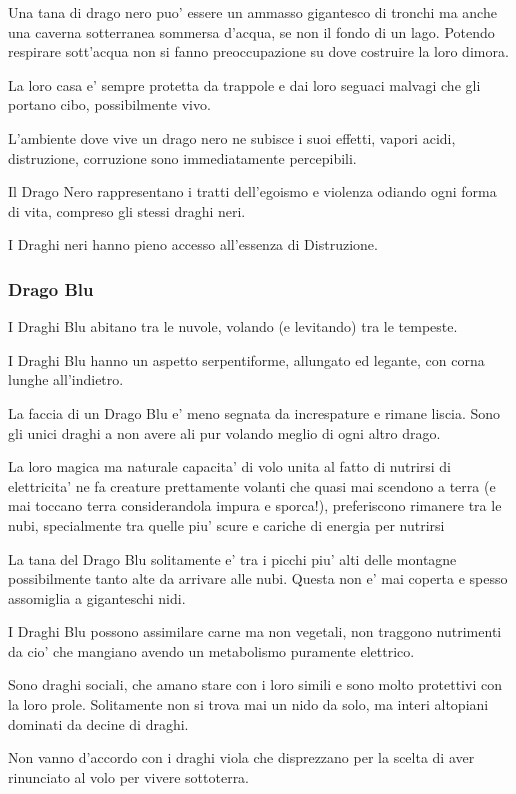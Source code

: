 \documentclass[a4paper,11pt,twoside,openany]{book}
\begin{document}
{Una tana di drago nero puo' essere un ammasso gigantesco di tronchi ma anche una caverna sotterranea sommersa d'acqua, se non il fondo di un lago.
Potendo respirare sott'acqua non si fanno preoccupazione su dove costruire la loro dimora.

La loro casa e' sempre protetta da trappole e dai loro seguaci malvagi che gli portano cibo, possibilmente vivo.

L'ambiente dove vive un drago nero ne subisce i suoi effetti, vapori acidi, distruzione, corruzione sono immediatamente percepibili.

Il Drago Nero rappresentano i tratti dell'egoismo e violenza odiando ogni forma di vita, compreso gli stessi draghi neri.

I Draghi neri hanno pieno accesso all'essenza di Distruzione.


\subsubsection{Drago Blu} 

I Draghi Blu abitano tra le nuvole, volando (e levitando) tra le tempeste.

I Draghi Blu hanno un aspetto serpentiforme, allungato ed legante, con corna lunghe all'indietro.

La faccia di un Drago Blu e' meno segnata da increspature e rimane liscia.
Sono gli unici draghi a non avere ali pur volando meglio di ogni altro drago.

La loro magica ma naturale capacita' di volo unita al fatto di nutrirsi di elettricita' ne fa creature prettamente volanti che quasi mai scendono a terra (e mai toccano terra considerandola impura e sporca!), preferiscono rimanere tra le nubi, specialmente tra quelle piu' scure e cariche di energia per nutrirsi 

La tana del Drago Blu solitamente e' tra i picchi piu' alti delle montagne possibilmente tanto alte da arrivare alle nubi. Questa non e' mai coperta e spesso assomiglia a giganteschi nidi.

I Draghi Blu possono assimilare carne ma non vegetali, non traggono nutrimenti da cio' che mangiano avendo un metabolismo puramente elettrico.

Sono draghi sociali, che amano stare con i loro simili e sono molto protettivi con la loro prole.
Solitamente non si trova mai un nido da solo, ma interi altopiani dominati da decine di draghi.

Non vanno d'accordo con i draghi viola che disprezzano per la scelta di aver rinunciato al volo per vivere sottoterra.

}
\end{document}
